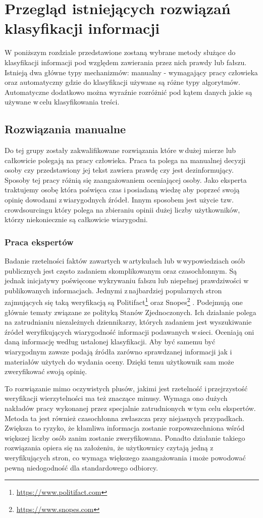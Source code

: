 \newpage %
\section{Przegląd istniejących rozwiązań klasyfikacji informacji}
W poniższym rozdziale przedstawione zostaną wybrane metody służące do klasyfikacji informacji pod względem zawierania przez nich prawdy lub fałszu. Istnieją dwa główne typy mechanizmów: manualny - wymagający pracy człowieka oraz automatyczny gdzie do klasyfikacji używane są różne typy algorytmów. Automatyczne dodatkowo można wyraźnie rozróżnić pod kątem danych jakie są używane w\,celu klasyfikowania treści. 
\subsection{Rozwiązania manualne} \label{rozwiazania-manualne}
Do tej grupy zostały zakwalifikowane rozwiązania które w\,dużej mierze lub całkowicie polegają na pracy człowieka. Praca ta polega na manualnej decyzji osoby czy przedstawiony jej tekst zawiera prawdę czy jest dezinformujący. Sposoby tej pracy różnią się zaangażowaniem oceniającej osoby. Jako eksperta traktujemy osobę która poświęca czas i\,posiadaną wiedzę aby poprzeć swoją opinię dowodami z\,wiarygodnych źródeł. Innym sposobem jest użycie tzw. crowdsourcingu który polega na zbieraniu opinii dużej liczby użytkowników, którzy niekoniecznie są całkowicie wiarygodni. 
\subsubsection{Praca ekspertów}
Badanie rzetelności faktów zawartych w\,artykułach lub w\,wypowiedziach osób publicznych jest często zadaniem skomplikowanym oraz czasochłonnym. Są jednak inicjatywy poświęcone wykrywaniu fałszu lub niepełnej prawdziwości w\,publikowanych informacjach. Jednymi z\,najbardziej popularnych stron zajmujących się taką weryfikacją są Politifact\footnote{\url{https://www.politifact.com}} oraz Snopes\footnote{\url{https://www.snopes.com}} . Podejmują one głównie tematy związane ze polityką Stanów Zjednoczonych. Ich działanie polega na zatrudnianiu niezależnych dziennikarzy, których zadaniem jest wyszukiwanie źródeł weryfikujących wiarygodność informacji podawanych w\,sieci. Oceniają oni daną informację według ustalonej klasyfikacji. Aby być samemu być wiarygodnym zawsze podają źródła zarówno sprawdzanej informacji jak i\,materiałów użytych do wydania oceny. Dzięki temu użytkownik sam może zweryfikować swoją opinię. 
\par To rozwiązanie mimo oczywistych plusów, jakimi jest rzetelność i\,przejrzystość weryfikacji wierzytelności ma też znaczące minusy. Wymaga ono dużych nakładów pracy wykonanej przez specjalnie zatrudnionych w\,tym celu ekspertów. Metoda ta jest również czasochłonna zwłaszcza przy niejasnych przypadkach. Zwiększa to ryzyko, że kłamliwa informacja zostanie rozpowszechniona wśród większej liczby osób zanim zostanie zweryfikowana. Ponadto działanie takiego rozwiązania opiera się na założeniu, że użytkownicy czytają jedną z\,weryfikujących stron, co wymaga większego zaangażowania i\,może powodować pewną niedogodność dla standardowego odbiorcy. 
